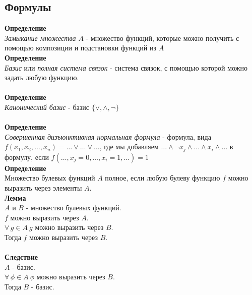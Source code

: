\documentclass[12pt]{article}
\begin{document}
\subsection{Формулы}
\textbf{Определение}\\
\textit{Замыкание множества $A$} - множество функций, которые можно получить с помощью композиции и подстановки функций из $A$\\
\textbf{Определение}\\
\textit{Базис} или \textit{полная система связок} - система связок, с помощью которой можно задать любую функцию.\\\\
\textbf{Определение}\\
\textit{Канонический базис} - базис $\{\lor,\land,\lnot\}$\\\\
\textbf{Определение}\\
\textit{Совершенная дизъюнктивная нормальная формула} - формула, вида\\
$f(x_1, x_2, \ldots, x_n) = \ldots \lor \ldots \lor \ldots$, где мы добавляем $\ldots \land \lnot x_j \land \ldots \land x_i \land \ldots $ в формулу, если $f(\ldots, x_j = 0,\ldots, x_i = 1, \ldots) = 1$\\
\textbf{Определение}\\
Множество булевых функций $A$ полное, если любую булеву функцию $f$ можно выразить через элементы $A$.\\
\textbf{Лемма}\\
$A$ и $B$ - множество булевых функций.\\
$f$ можно выразить через $A$.\\
$\forall\,g\in A\ g$ можно выразить через $B$.\\
Тогда $f$ можно выразить через $B$.\\\\
\textbf{Следствие}\\
$A$ - базис.\\
$\forall\,\phi \in A\ \phi$ можно выразить через $B$.\\
Тогда $B$ - базис.
\end{document}
